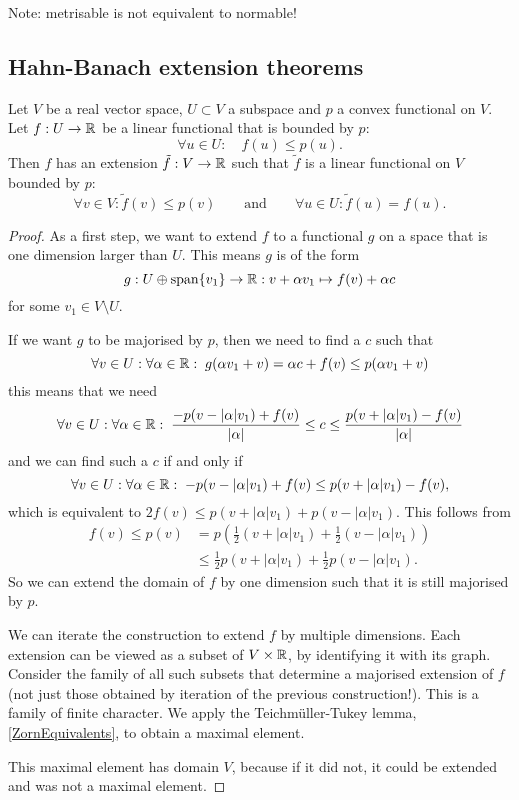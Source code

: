 Note: metrisable is not equivalent to normable!






\subsection{Hahn-Banach extension theorems}
\begin{theorem} \label{convexHahnBanach}
Let $V$ be a real vector space, $U\subset V$ a subspace and $p$ a convex functional on $V$. Let $f:U\to\mathbb{R}$ be a linear functional that is bounded by $p$:
\[ \forall u\in U: \quad f(u) \leq p(u). \]
Then $f$ has an extension $\tilde{f}: V\to \mathbb{R}$ such that $\tilde{f}$ is a linear functional on $V$ bounded by $p$:
\[ \forall v\in V: \tilde{f}(v) \leq p(v) \qquad \text{and} \qquad \forall u\in U: \tilde{f}(u) = f(u). \]
\end{theorem}
\begin{proof}
As a first step, we want to extend $f$ to a functional $g$ on a space that is one dimension larger than $U$. This means $g$ is of the form
\[ g: U\oplus\operatorname{span}\{v_1\}\to\mathbb{R}: v + \alpha v_1 \mapsto f(v) + \alpha c \]
for some $v_1\in V\setminus U$.

If we want $g$ to be majorised by $p$, then we need to find a $c$ such that
\[ \forall v\in U: \forall \alpha\in\mathbb{R}: \; g(\alpha v_1 + v) = \alpha c + f(v) \leq p(\alpha v_1 + v) \]
this means that we need
\[ \forall v\in U: \forall \alpha\in\mathbb{R}:\; \frac{-p(v - |\alpha|v_1) + f(v)}{|\alpha|} \leq c \leq \frac{p(v + |\alpha|v_1) - f(v)}{|\alpha|} \]
and we can find such a $c$ if and only if
\[ \forall v\in U: \forall \alpha\in\mathbb{R}:\; -p(v - |\alpha|v_1) + f(v) \leq p(v + |\alpha|v_1) - f(v), \]
which is equivalent to $2f(v) \leq p(v+|\alpha|v_1)+p(v-|\alpha|v_1)$. This follows from
\begin{align*}
f(v) \leq p(v) &= p(\tfrac{1}{2}(v+|\alpha|v_1) + \tfrac{1}{2}(v-|\alpha|v_1)) \\
&\leq \tfrac{1}{2}p(v+|\alpha|v_1) + \tfrac{1}{2}p(v-|\alpha|v_1).
\end{align*}
So we can extend the domain of $f$ by one dimension such that it is still majorised by $p$.

We can iterate the construction to extend $f$ by multiple dimensions. Each extension can be viewed as a subset of $V\times \mathbb{R}$, by identifying it with its graph.
Consider the family of all such subsets that determine a majorised extension of $f$ (not just those obtained by iteration of the previous construction!). This is a family of finite character. We apply the Teichmüller-Tukey lemma, \ref{ZornEquivalents}, to obtain a maximal element.

This maximal element has domain $V$, because if it did not, it could be extended and was not a maximal element.
\end{proof}
